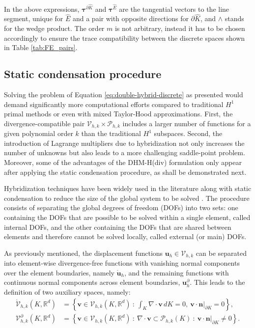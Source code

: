 \documentclass[english,11pt,3p,number,sort&compress]{elsarticle}
\begin{document}
\noindent In the above expressions, $\bm{\tau}^{\partial\hat{K}}$ and $\bm{\tau}^{\hat{E}}$ are the tangential vectors to the line segment, unique for $\hat{E}$ and a pair with opposite directions for $\partial\hat{K}$, and $\wedge$ stands for the wedge product. The order $m$ is not arbitrary, instead it has to be chosen accordingly to ensure the trace compatibility between the discrete spaces shown in Table \ref{tab:FE_pairs}.

\subsection{Static condensation procedure} \label{sec:static-condensation}

Solving the problem of Equation \eqref{eq:double-hybrid-discrete} as presented would demand significantly more computational efforts compared to traditional $H^1$ primal methods or even with mixed Taylor-Hood approximations. First, the divergence-compatible pair $\mathcal{V}_{h,k} \times \mathcal{P}_{h,k}$ includes a larger number of functions for a given polynomial order $k$ than the traditional $H^1$ subspaces. Second, the introduction of Lagrange multipliers due to hybridization not only increases the number of unknowns but also leads to a more challenging saddle-point problem. Moreover, some of the advantages of the DHM-H(div) formulation only appear after applying the static condensation procedure, as shall be demonstrated next.

Hybridization techniques have been widely used in the literature along with static condensation to reduce the size of the global system to be solved \cite{castro2016three,dobrev2019algebraic}. The procedure consists of separating the global degrees of freedom (DOFs) into two sets: one containing the DOFs that are possible to be solved within a single element, called internal DOFs, and the other containing the DOFs that are shared between elements and therefore cannot be solved locally, called external (or main) DOFs.

As previously mentioned, the displacement functions $\bm{u}_h \in \mathcal{V}_{h,k}$ can be separated into element-wise divergence-free functions with vanishing normal components over the element boundaries, namely $\mathring{\bm{u}}_h$, and the remaining functions with continuous normal components across element boundaries, $\bm{u}^\partial_h$. This leads to the definition of two auxiliary spaces, namely:
\begin{subequations} \label{eq:internal-external-functions}
	\begin{align}
		\mathring{\mathcal{V}}_{h,k}(K,\mathbb{R}^d) &= \left\{ \bm{v} \in \mathcal{V}_{h,k}(K,\mathbb{R}^d) ~:~ \int_K\nabla \cdot \bm{v}\,dK = 0, ~\bm{v}\cdot\bm{n}\lvert_{\partial K} = 0 \right\},\\
		\mathcal{V}^\partial_{h,k}(K,\mathbb{R}^d) &= \left\{ \bm{v} \in \mathcal{V}_{h,k}(K,\mathbb{R}^d) ~:~ \nabla \cdot \bm{v} \subset \mathcal{P}_{h,k}(K) ~:~ \bm{v}\cdot\bm{n}\lvert_{\partial K} \neq 0 \right\}.
	\end{align}
\end{subequations}
\end{document}
